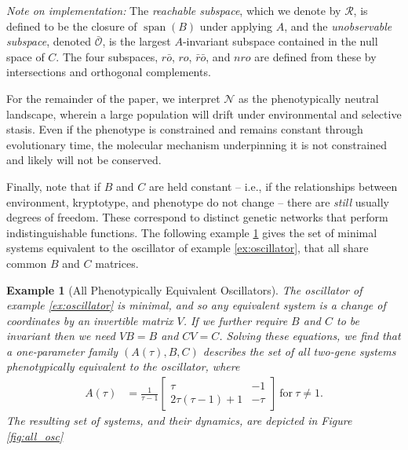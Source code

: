 \documentclass{article}
\newcommand{\ro}{{ro}}
\newcommand{\rno}{{r\bar{o}}}
\newcommand{\nrno}{{\bar{r}\bar{o}}}
\newcommand{\reachable}{\mathcal{R}}
\newcommand{\unobservable}{\bar{\mathcal{O}}}
\newcommand{\1}{\mathbbm{1}}
\newcommand{\Sys}{\mathcal{S}}
\newcommand{\allS}{\mathcal{N}}
\DeclareMathOperator{\spn}{span}
\newtheorem{example}{Example}
\begin{document}
\emph{Note on implementation:}
The \emph{reachable subspace},
which we denote by $\reachable$,
is defined to be the closure of $\spn(B)$ under applying $A$,
and the \emph{unobservable subspace}, 
denoted $\unobservable$, is the largest $A$-invariant subspace
contained in the null space of $C$.
The four subspaces, $\rno$, $\ro$, $\nrno$, and $nro$
are defined from these by intersections and orthogonal complements.


For the remainder of the paper, we interpret $\allS$ as the phenotypically neutral landscape, 
wherein a large population will drift under environmental and selective stasis. 
Even if the phenotype is constrained and remains constant through evolutionary time, 
the molecular mechanism underpinning it is not constrained and likely will not be conserved.

Finally, note that if $B$ and $C$ are held constant --
i.e., if the relationships between environment, kryptotype, and phenotype do not change --
there are \emph{still} usually degrees of freedom. 
These correspond to distinct genetic networks that perform indistinguishable functions. 
The following example \ref{ex:all_osc} gives the set of minimal systems equivalent to the oscillator of example \ref{ex:oscillator},
that all share common $B$ and $C$ matrices.


\begin{example}[All Phenotypically Equivalent Oscillators] \label{ex:all_osc}
The oscillator of example \ref{ex:oscillator} is minimal, and so any equivalent system is a change of coordinates
by an invertible matrix $V$.
If we further require $B$ and $C$ to be invariant then we need $VB=B$ and $CV=C$.
Solving these equations,
we find that a one-parameter family $(A(\tau), B, C)$ describes the set of all two-gene systems
phenotypically equivalent to the oscillator,
where
    \begin{align*}
      A(\tau) &= \frac{1}{\tau-1} \begin{bmatrix} \tau & -1 \\ 2 \tau(\tau - 1) + 1 &  -\tau \end{bmatrix} \ \text{for} \ \tau \neq 1 .
    \end{align*}
The resulting set of systems,
and their dynamics, are depicted in Figure \ref{fig:all_osc}
\end{example}
\end{document}
